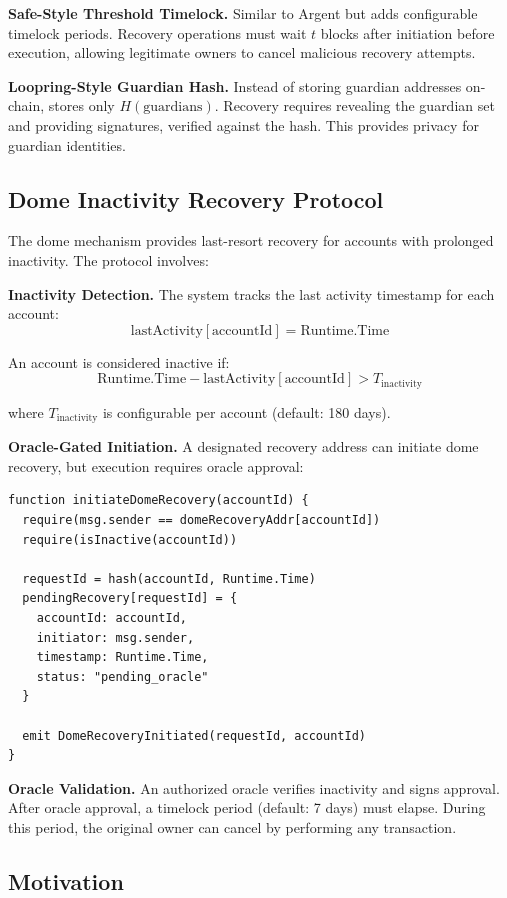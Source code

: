 \documentclass[10pt,twocolumn]{article}
\begin{document}
\textbf{Safe-Style Threshold Timelock.} Similar to Argent but adds configurable timelock periods. Recovery operations must wait $t$ blocks after initiation before execution, allowing legitimate owners to cancel malicious recovery attempts.

\textbf{Loopring-Style Guardian Hash.} Instead of storing guardian addresses on-chain, stores only $H(\text{guardians})$. Recovery requires revealing the guardian set and providing signatures, verified against the hash. This provides privacy for guardian identities.

\subsection{Dome Inactivity Recovery Protocol}

The dome mechanism provides last-resort recovery for accounts with prolonged inactivity. The protocol involves:

\textbf{Inactivity Detection.} The system tracks the last activity timestamp for each account:
$$\text{lastActivity}[\text{accountId}] = \text{Runtime.Time}$$

An account is considered inactive if:
$$\text{Runtime.Time} - \text{lastActivity}[\text{accountId}] > T_{\text{inactivity}}$$

where $T_{\text{inactivity}}$ is configurable per account (default: 180 days).

\textbf{Oracle-Gated Initiation.} A designated recovery address can initiate dome recovery, but execution requires oracle approval:

\begin{verbatim}
function initiateDomeRecovery(accountId) {
  require(msg.sender == domeRecoveryAddr[accountId])
  require(isInactive(accountId))
  
  requestId = hash(accountId, Runtime.Time)
  pendingRecovery[requestId] = {
    accountId: accountId,
    initiator: msg.sender,
    timestamp: Runtime.Time,
    status: "pending_oracle"
  }
  
  emit DomeRecoveryInitiated(requestId, accountId)
}
\end{verbatim}

\textbf{Oracle Validation.} An authorized oracle verifies inactivity and signs approval. After oracle approval, a timelock period (default: 7 days) must elapse. During this period, the original owner can cancel by performing any transaction.


\subsection{Motivation}
\end{document}
